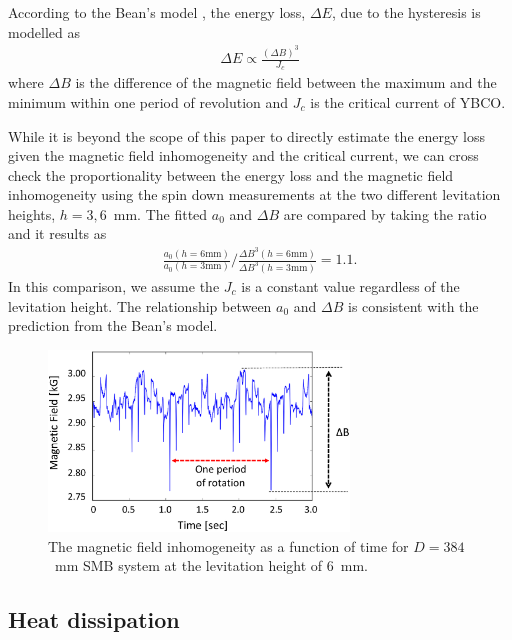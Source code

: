 \documentclass[journal]{IEEEtran}
\begin{document}
According to the Bean's model \cite{beans_model_1,beans_model_2}, the energy loss, $\Delta E$, due to the hysteresis is modelled as
\begin{eqnarray}
\Delta E \propto \frac{(\Delta B)^3}{J_c}
\label{eq:bean}
\end{eqnarray}
where $\Delta B$ is the difference of the magnetic field between the maximum and the minimum within one period of revolution and $J_c$ is the critical current of YBCO.

While it is beyond the scope of this paper to directly estimate the energy loss given the magnetic field inhomogeneity and the critical current, we can cross check the proportionality between the energy loss and the magnetic field inhomogeneity using the spin down measurements at the two different levitation heights, $h=3, 6$~mm.
The fitted $a_0$ and $\Delta B$ are compared by taking the ratio and it results as
\begin{eqnarray}
\frac{a_0(h=6\mbox{mm})}{a_0(h=3\mbox{mm})} / \frac{\Delta B^3(h=6\mbox{mm})}{\Delta B^3(h=3\mbox{mm})} = 1.1.
\label{eq:beanmodelcheck}
\end{eqnarray}
In this comparison, we assume the $J_c$ is a constant value regardless of the levitation height.
The relationship between $a_0$ and $\Delta B$ is consistent with the prediction from the Bean's model.

\begin{figure}[htb]
   \centering
   \includegraphics[width=80mm]{magneticfieldvariation_rev2.eps} %
   \caption{The magnetic field inhomogeneity as a function of time for $D=384$~mm SMB system at the levitation height of 6~mm. }
   \label{fig:Bval}
\end{figure}

\subsection{Heat dissipation}
\end{document}
